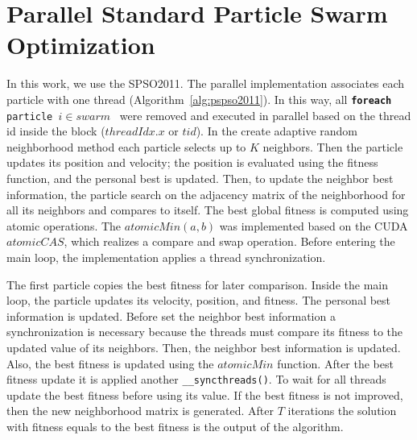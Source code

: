 \documentclass{article}
\begin{document}
    \section{Parallel Standard Particle Swarm Optimization}

    In this work, we use the SPSO2011.  The parallel implementation associates each particle with one thread (Algorithm~\ref{alg:pspso2011}).
    In this way, all \texttt{{\bf foreach} particle $ i \in swarm$ } were removed and executed in parallel based on the thread id inside the block ($threadIdx.x$ or $tid$).
    In the create adaptive random neighborhood method each particle selects up to $K$ neighbors. Then the particle updates its position and velocity; the position is evaluated using the fitness function, and the personal best is updated.
    Then, to update the neighbor best information, the particle search on the adjacency matrix of the neighborhood for all its neighbors and compares to itself.
    The best global fitness is computed using atomic operations. The $atomicMin(a, b)$ was implemented based on the CUDA $atomicCAS$, which realizes a compare and swap operation.
    Before entering the main loop, the implementation applies a thread synchronization.

    The first particle copies the best fitness for later comparison.
    Inside the main loop, the particle updates its velocity, position, and fitness.
    The personal best information is updated.
    Before set the neighbor best information a synchronization is necessary because the threads must compare its fitness to the updated value of its neighbors.
    Then, the neighbor best information is updated. Also, the best fitness is updated using the $atomicMin$ function.
    After the best fitness update it is applied another \texttt{\_\_syncthreads()}. To wait for all threads update the best fitness before using its value.
    If the best fitness is not improved, then the new neighborhood matrix is generated.
    After $T$ iterations the solution with fitness equals to the best fitness is the output of the algorithm.
\end{document}
